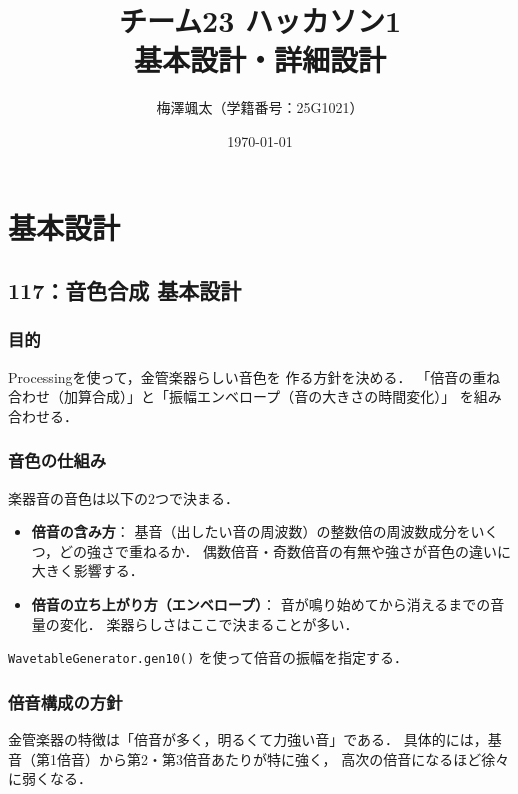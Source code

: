 \documentclass[a4paper,12pt]{jsarticle}
\title{チーム23 ハッカソン1\\
       基本設計・詳細設計\\[0.5em] 
       }
\author{梅澤颯太（学籍番号：25G1021）}
\date{\today}
\begin{document}
\maketitle
\tableofcontents
\newpage

\section{基本設計}

\subsection{117：音色合成 基本設計}

\subsubsection{目的}
Processingを使って，金管楽器らしい音色を
作る方針を決める．
「倍音の重ね合わせ（加算合成）」と「振幅エンベロープ（音の大きさの時間変化）」
を組み合わせる．

\subsubsection{音色の仕組み}
楽器音の音色は以下の2つで決まる．

\begin{itemize}
  \item \textbf{倍音の含み方}：
        基音（出したい音の周波数）の整数倍の周波数成分をいくつ，どの強さで重ねるか．
        偶数倍音・奇数倍音の有無や強さが音色の違いに大きく影響する．
  \item \textbf{倍音の立ち上がり方（エンベロープ）}：
        音が鳴り始めてから消えるまでの音量の変化．
        楽器らしさはここで決まることが多い．
\end{itemize}

\noindent
\texttt{WavetableGenerator.gen10()} を使って倍音の振幅を指定する．

\subsubsection{倍音構成の方針}

金管楽器の特徴は「倍音が多く，明るくて力強い音」である．
具体的には，基音（第1倍音）から第2・第3倍音あたりが特に強く，
高次の倍音になるほど徐々に弱くなる．
\end{document}
